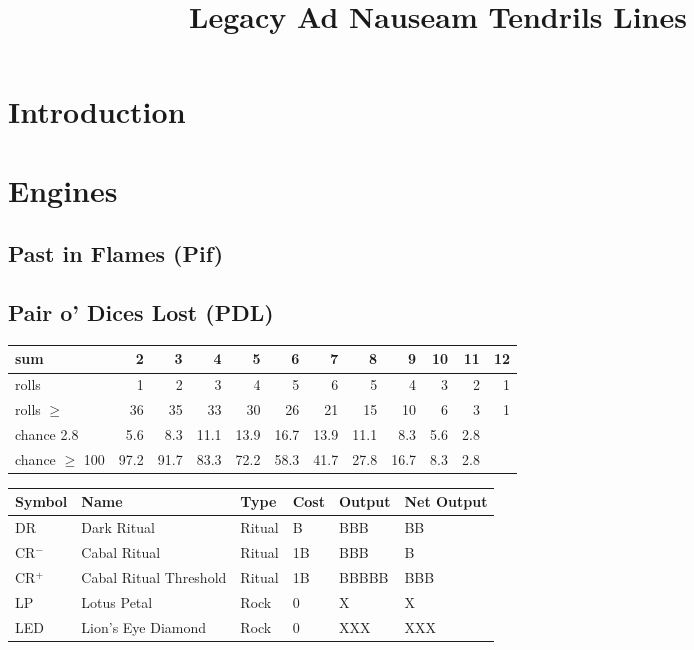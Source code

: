 \documentclass{article}
\title{Legacy Ad Nauseam Tendrils Lines}
\newcommand{\dr}{DR}
\newcommand{\crn}{CR$^-$}
\newcommand{\crt}{CR$^+$}
\newcommand{\lp}{LP}
\newcommand{\led}{LED}
\begin{document}
\maketitle


\begin{abstract}
\end{abstract}
\section{Introduction}
\section{Engines}
\subsection{Past in Flames (Pif)}
\subsection{Pair o' Dices Lost (PDL)}

\begin{tabular}{lrrrrrrrrrrr}
\toprule
sum				&2		&3		&4		&5		&6		&7		&8		&9		&10		&11		&12\\
\midrule
rolls			&1		&2		&3		&4		&5		&6		&5		&4		&3		&2		&1\\
rolls $\geq$	&36		&35		&33		&30		&26		&21		&15		&10		&6		&3		&1\\
\midrule
chance			2.8		&5.6	&8.3	&11.1	&13.9	&16.7	&13.9	&11.1	&8.3	&5.6	&2.8\\
chance $\geq$	100		&97.2	&91.7	&83.3	&72.2	&58.3	&41.7	&27.8	&16.7	&8.3	&2.8\\
\bottomrule
\end{tabular}

\begin{tabular}{@{}llllll@{}}
\toprule
\textbf{Symbol}	&\textbf{Name}				&\textbf{Type} &\textbf{Cost}	&\textbf{Output}	&\textbf{Net Output} \\ 
\midrule
\dr{}			&Dark Ritual					&Ritual			&B				&BBB				&BB\\
\crn{}			&Cabal Ritual				&Ritual			&1B				&BBB				&B\\
\crt{}			&Cabal Ritual Threshold		&Ritual			&1B				&BBBBB				&BBB\\
\lp{}			&Lotus Petal					&Rock			&0				&X					&X\\
\led{}			&Lion's Eye Diamond			&Rock			&0				&XXX				&XXX\\
\bottomrule
\end{tabular}
\end{document}
